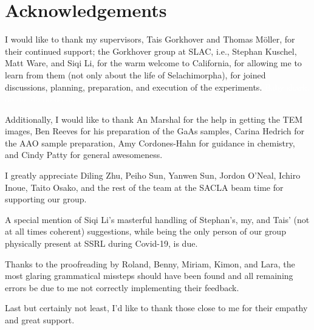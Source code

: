 \chapter*{Acknowledgements}
\onehalfspacing
I would like to thank my supervisors, Tais Gorkhover and Thomas Möller, for their continued support; the Gorkhover group at SLAC, i.e., Stephan Kuschel, Matt Ware, and Siqi Li, for the warm welcome to California, for allowing me to learn from them (not only about the life of Selachimorpha), for joined discussions, planning, preparation, and execution of the experiments. \textcolor{white}{Baby shark, do do, do do do do}

Additionally, I would like to thank An Marshal for the help in getting the TEM images, Ben Reeves for his preparation of the GaAs samples, Carina Hedrich for the AAO sample preparation, Amy Cordones-Hahn for guidance in chemistry, and Cindy Patty for general awesomeness.

I greatly appreciate Diling Zhu, Peiho Sun, Yanwen Sun, Jordon O'Neal, Ichiro Inoue, Taito Osako, and the rest of the team at the SACLA beam time for supporting our group. 

A special mention of Siqi Li's masterful handling of Stephan's, my, and Tais' (not at all times coherent) suggestions, while being the only person of our group physically present at SSRL during Covid-19, is due.

Thanks to the proofreading by Roland, Benny, Miriam, Kimon, and Lara, the most glaring grammatical missteps should have been found and all remaining errors be due to me not correctly implementing their feedback. 

Last but certainly not least, I'd like to thank those close to me for their empathy and great support.